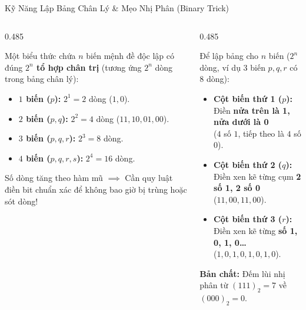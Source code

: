\documentclass[aspectratio=169, 10pt]{beamer}
\begin{document}
\begin{frame}{Kỹ Năng Lập Bảng Chân Lý \& Mẹo Nhị Phân (Binary Trick)}
  \begin{columns}[t, onlytextwidth]
    \begin{column}{0.485\textwidth}
      \begin{cozyDef}
        \small
        Một biểu thức chứa $n$ biến mệnh đề độc lập có đúng \textbf{$2^n$ tổ hợp chân trị} (tương ứng $2^n$ dòng trong bảng chân lý):
        \begin{itemize}
          \setlength{\itemsep}{2pt}
          \item \textbf{$1$ biến ($p$):} $2^1 = 2$ dòng ($1, 0$).
          \item \textbf{$2$ biến ($p, q$):} $2^2 = 4$ dòng ($11, 10, 01, 00$).
          \item \textbf{$3$ biến ($p, q, r$):} $2^3 = 8$ dòng.
          \item \textbf{$4$ biến ($p, q, r, s$):} $2^4 = 16$ dòng.
        \end{itemize}
        \vspace{0.05cm}
        \par\footnotesize\color{cozyMuted}Số dòng tăng theo hàm mũ $\implies$ Cần quy luật điền bit chuẩn xác để không bao giờ bị trùng hoặc sót dòng!
      \end{cozyDef}
    \end{column}
    \begin{column}{0.485\textwidth}
      \begin{cozyMethod}
        \small
        Để lập bảng cho $n$ biến ($2^n$ dòng, ví dụ 3 biến $p, q, r$ có $8$ dòng):
        \begin{itemize}
          \setlength{\itemsep}{2pt}
          \item \textbf{Cột biến thứ 1 ($p$):} Điền \textbf{nửa trên là 1, nửa dưới là 0}\\
          ($4$ số $1$, tiếp theo là $4$ số $0$).
          \item \textbf{Cột biến thứ 2 ($q$):} Điền xen kẽ từng cụm \textbf{2 số 1, 2 số 0}\\
          ($11, 00, 11, 00$).
          \item \textbf{Cột biến thứ 3 ($r$):} Điền xen kẽ từng \textbf{số 1, 0, 1, 0\dots}\\
          ($1, 0, 1, 0, 1, 0, 1, 0$).
        \end{itemize}
        \vspace{0.05cm}
        \par\footnotesize\color{cozyWarm}\textbf{Bản chất:} Đếm lùi nhị phân từ $(111)_2 = 7$ về $(000)_2 = 0$.
      \end{cozyMethod}
    \end{column}
  \end{columns}
\end{frame}
\end{document}

